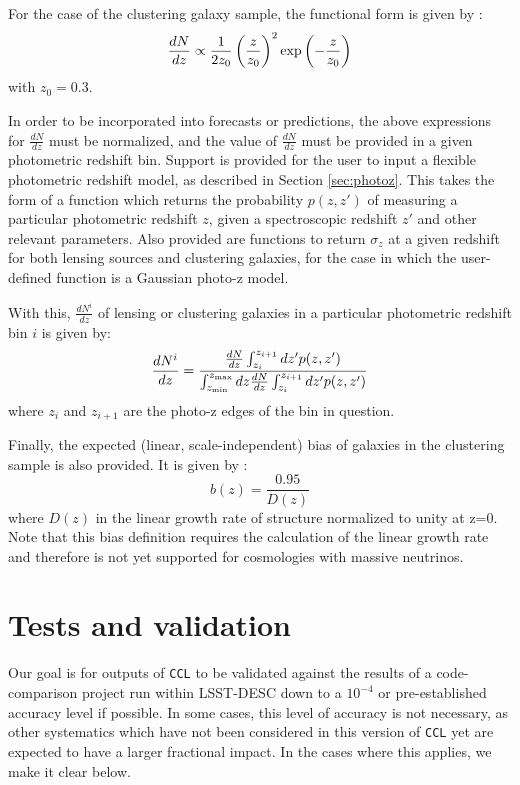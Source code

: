\documentclass[\docopts]{\docclass}
\newcommand{\ccl}{{\tt CCL}\xspace}
\begin{document}
For the case of the clustering galaxy sample, the functional form is given by \citep{ScienceBook}:
\begin{equation}
\frac{dN}{dz} \propto \frac{1}{2z_0}\left(\frac{z}{z_0}\right)^2 {\rm exp}\left(-\frac{z}{z_0}\right)
\label{dndz_clust}
\end{equation}
with $z_0=0.3$.

In order to be incorporated into forecasts or predictions, the above expressions for $\frac{dN}{dz}$ must be normalized, and the value of $\frac{dN}{dz}$ must be provided in a given photometric redshift bin. Support is provided for the user to input a flexible photometric redshift model, as described in Section \ref{sec:photoz}. This takes the form of a function which returns the probability $p(z,z')$ of measuring a particular photometric redshift $z$, given a spectroscopic redshift $z'$ and other relevant parameters. Also provided are functions to return $\sigma_z$ at a given redshift for both lensing sources and clustering galaxies, for the case in which the user-defined function is a Gaussian photo-z model.

With this, $\frac{dN^i}{dz}$ of lensing or clustering galaxies in a particular photometric redshift bin $i$ is given by:
\begin{equation}
\frac{dN^i}{dz} = \frac{\frac{dN}{dz}\int_{z_i}^{z_{i+1}} dz' p(z,z')}{\int_{z_{\rm min}}^{z_{\rm max}}dz \frac{dN}{dz} \int_{z_i}^{z_{i+1}}dz' p(z, z')}
\label{photoz}
\end{equation}
where $z_{i}$ and $z_{i+1}$ are the photo-z edges of the bin in question.

Finally, the expected (linear, scale-independent) bias of galaxies in the clustering sample is also provided. It is given by \citep{ScienceBook}:
\begin{equation}
b(z) = \frac{0.95}{D(z)}
\label{clustbias}
\end{equation}
where $D(z)$ in the linear growth rate of structure normalized to unity at z=0. Note that this bias definition requires the calculation of the linear growth rate and therefore is not yet supported for cosmologies with massive neutrinos.

\section{Tests and validation}
\label{sec:tests}

Our goal is for outputs of \ccl to be validated against the results of a code-comparison project run within LSST-DESC down to a $10^{-4}$ or pre-established accuracy level if possible. In some cases, this level of accuracy is not necessary, as other systematics which have not been considered in this version of \ccl yet are expected to have a larger fractional impact. In the cases where this applies, we make it clear below.
\end{document}
